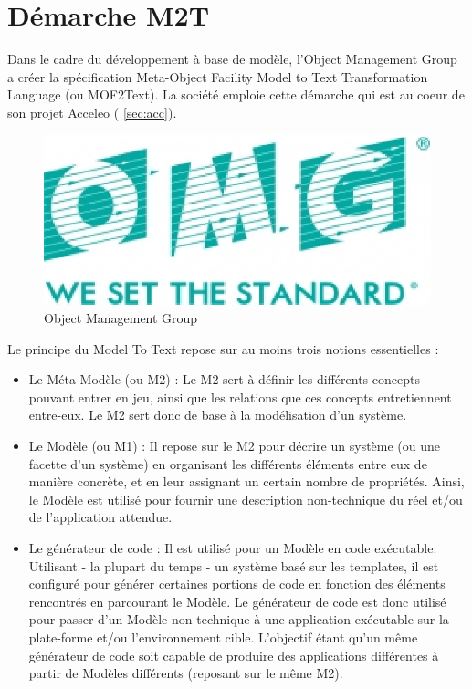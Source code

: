 \section{Démarche M2T}\label{sec:m2t}

Dans le cadre du développement à base de modèle, l'Object Management Group \cite{omg} a créer la spécification Meta-Object Facility Model to Text Transformation Language (ou MOF2Text). La société \kwobeo emploie cette démarche qui est au coeur de son projet Acceleo (\cf{} \ref{sec:acc}).

\begin{figure}[htb]
  \centering
  \includegraphics[scale=.6]{img/omg.eps}
  \caption{Object Management Group}
  \label{fig:omg}
\end{figure}


Le principe du Model To Text repose sur au moins trois notions essentielles :
\begin{itemize}
\item Le Méta-Modèle (ou M2) : Le M2 sert à définir les différents concepts pouvant entrer en jeu, ainsi que les relations que ces concepts entretiennent entre-eux. Le M2 sert donc de base à la modélisation d'un système.
\item Le Modèle (ou M1) : Il repose sur le M2 pour décrire un système (ou une facette d'un système) en organisant les différents éléments entre eux de manière concrète, et en leur assignant un certain nombre de propriétés. Ainsi, le Modèle est utilisé pour fournir une description non-technique du réel et/ou de l'application attendue.
\item Le générateur de code : Il est utilisé pour  un Modèle en code exécutable. Utilisant - la plupart du temps - un système basé sur les templates, il est configuré pour générer certaines portions de code en fonction des éléments rencontrés en parcourant le Modèle. Le générateur de code est donc utilisé pour passer d'un Modèle non-technique à une application exécutable sur la plate-forme et/ou l'environnement cible. L'objectif étant qu'un même générateur de code soit capable de produire des applications différentes à partir de Modèles différents (reposant sur le même M2).\\
\end{itemize}

